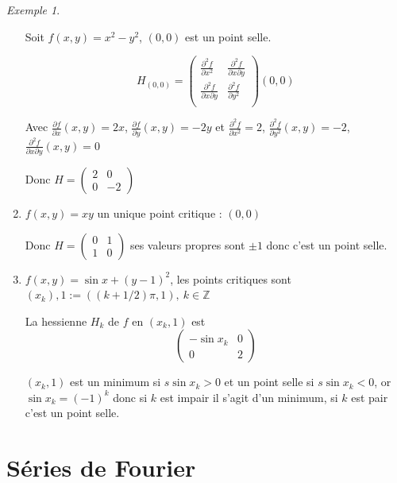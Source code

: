 \documentclass[]{article}
\theoremstyle{remark}
\newtheorem{myexmpl}{Exemple}
\theoremstyle{definition}
\begin{document}
\begin{myexmpl}
	\begin{enumerate}
		Soit $f(x, y) = x^2 - y^2$, $(0, 0)$ est un point selle.
		
		$$H_{(0, 0)} = \left(
		\begin{array}{cc}
			\frac{\partial^2f}{\partial x^2} & \frac{\partial^2f}{\partial x \partial y} \\
			\frac{\partial^2f}{\partial x \partial y} & \frac{\partial^2f}{\partial y^2}\\
		\end{array}
		\right)(0, 0)$$
		
		Avec $\frac{\partial f}{\partial x}(x, y) = 2x$, $\frac{\partial f}{\partial y}(x, y) = -2y$ et  $\frac{\partial^2 f}{\partial x^2} = 2$, $\frac{\partial^2 f}{\partial y^2} (x,y)= -2$, $\frac{\partial^2f}{\partial x \partial y} (x, y) = 0$
		
		Donc $H=\left(
		\begin{array}{cc}
			2 & 0 \\
			0 & -2
		\end{array}\right)$
		
		\item $f(x, y) = xy$ un unique point critique : $(0, 0)$

		Donc $H=\left(
				\begin{array}{cc}
					0 & 1 \\
					1 & 0
				\end{array}\right)$
		ses valeurs propres sont $\pm 1$ donc c'est un point selle.
		
		\item $f(x, y) = \sin x + (y-1)^2$, les points critiques sont $(x_k), 1 := ((k+1/2)\pi, 1), ~ k \in \mathbb{Z}$
		
		La hessienne $H_k$ de $f$ en $(x_k, 1)$ est 
		$$\left(
		\begin{array}{cc}
			- \sin x_k & 0 \\
			0 & 2
		\end{array}	\right)$$
		
		$(x_k, 1)$ est un minimum si $s\sin x_k > 0$ et un point selle si $s \sin x_k < 0$, or $\sin x_k = (-1)^k$ donc si $k$ est impair il s'agit d'un minimum, si $k$ est pair c'est un point selle. 
				
	\end{enumerate}
\end{myexmpl}

\part{Séries de Fourier}
\end{document}
